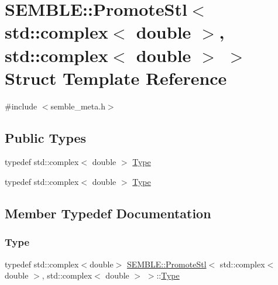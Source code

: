 \hypertarget{structSEMBLE_1_1PromoteStl_3_01std_1_1complex_3_01double_01_4_00_01std_1_1complex_3_01double_01_4_01_4}{}\section{S\+E\+M\+B\+LE\+:\+:Promote\+Stl$<$ std\+:\+:complex$<$ double $>$, std\+:\+:complex$<$ double $>$ $>$ Struct Template Reference}
\label{structSEMBLE_1_1PromoteStl_3_01std_1_1complex_3_01double_01_4_00_01std_1_1complex_3_01double_01_4_01_4}


{\ttfamily \#include $<$semble\+\_\+meta.\+h$>$}

\subsection*{Public Types}
\begin{DoxyCompactItemize}
\item 
typedef std\+::complex$<$ double $>$ \mbox{\hyperlink{structSEMBLE_1_1PromoteStl_3_01std_1_1complex_3_01double_01_4_00_01std_1_1complex_3_01double_01_4_01_4_a4204146a4eeb0fb567fb999f49c4e933}{Type}}
\item 
typedef std\+::complex$<$ double $>$ \mbox{\hyperlink{structSEMBLE_1_1PromoteStl_3_01std_1_1complex_3_01double_01_4_00_01std_1_1complex_3_01double_01_4_01_4_a4204146a4eeb0fb567fb999f49c4e933}{Type}}
\end{DoxyCompactItemize}


\subsection{Member Typedef Documentation}
\mbox{\label{structSEMBLE_1_1PromoteStl_3_01std_1_1complex_3_01double_01_4_00_01std_1_1complex_3_01double_01_4_01_4_a4204146a4eeb0fb567fb999f49c4e933}} 
\subsubsection{\texorpdfstring{Type}{Type}\hspace{0.1cm}{\footnotesize\ttfamily [1/2]}}
{\footnotesize\ttfamily typedef std\+::complex$<$double$>$ \mbox{\hyperlink{structSEMBLE_1_1PromoteStl}{S\+E\+M\+B\+L\+E\+::\+Promote\+Stl}}$<$ std\+::complex$<$ double $>$, std\+::complex$<$ double $>$ $>$\+::\mbox{\hyperlink{structSEMBLE_1_1PromoteStl_3_01std_1_1complex_3_01double_01_4_00_01std_1_1complex_3_01double_01_4_01_4_a4204146a4eeb0fb567fb999f49c4e933}{Type}}}

